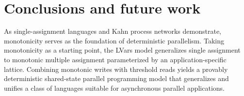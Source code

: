 \chapter{Conclusions and future work}\label{ch:conclusion} %



As single-assignment languages and Kahn process networks demonstrate,
monotonicity serves as the foundation of deterministic parallelism.
Taking monotonicity as a starting point, the LVars model generalizes
single assignment to monotonic multiple assignment parameterized by an
application-specific lattice.  Combining monotonic writes with
threshold reads yields a provably deterministic shared-state parallel
programming model that generalizes and unifies a class of languages
suitable for asynchronous parallel applications.


